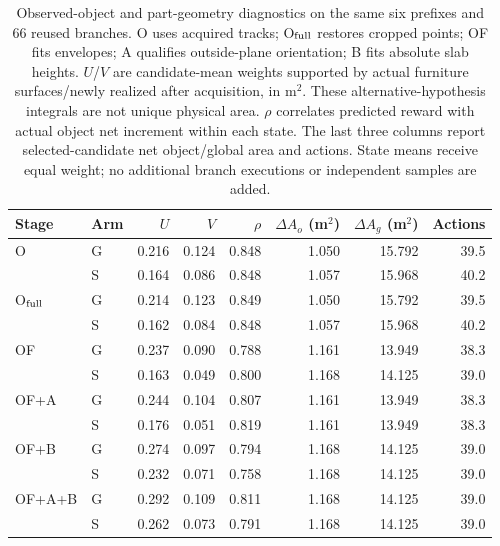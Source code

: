 \begin{table}[!htbp]
\centering\small\setlength{\tabcolsep}{4.0pt}
\caption{Observed-object and part-geometry diagnostics on the same six prefixes and 66 reused branches. O uses acquired tracks; O$_{\rm full}$ restores cropped points; OF fits envelopes; A qualifies outside-plane orientation; B fits absolute slab heights. $U$/$V$ are candidate-mean weights supported by actual furniture surfaces/newly realized after acquisition, in m$^2$. These alternative-hypothesis integrals are not unique physical area. $\rho$ correlates predicted reward with actual object net increment within each state. The last three columns report selected-candidate net object/global area and actions. State means receive equal weight; no additional branch executions or independent samples are added.}
\label{tab:observed-object-parts-diagnostic}
\begin{tabular}{llrrrrrr}
\toprule
Stage & Arm & $U$ & $V$ & $\rho$ & $\Delta A_o$ (m$^2$) & $\Delta A_g$ (m$^2$) & Actions \\
\midrule
O & G & 0.216 & 0.124 & 0.848 & 1.050 & 15.792 & 39.5 \\
 & S & 0.164 & 0.086 & 0.848 & 1.057 & 15.968 & 40.2 \\
O$_{\rm full}$ & G & 0.214 & 0.123 & 0.849 & 1.050 & 15.792 & 39.5 \\
 & S & 0.162 & 0.084 & 0.848 & 1.057 & 15.968 & 40.2 \\
OF & G & 0.237 & 0.090 & 0.788 & 1.161 & 13.949 & 38.3 \\
 & S & 0.163 & 0.049 & 0.800 & 1.168 & 14.125 & 39.0 \\
\midrule
OF+A & G & 0.244 & 0.104 & 0.807 & 1.161 & 13.949 & 38.3 \\
 & S & 0.176 & 0.051 & 0.819 & 1.161 & 13.949 & 38.3 \\
OF+B & G & 0.274 & 0.097 & 0.794 & 1.168 & 14.125 & 39.0 \\
 & S & 0.232 & 0.071 & 0.758 & 1.168 & 14.125 & 39.0 \\
OF+A+B & G & 0.292 & 0.109 & 0.811 & 1.168 & 14.125 & 39.0 \\
 & S & 0.262 & 0.073 & 0.791 & 1.168 & 14.125 & 39.0 \\
\bottomrule
\end{tabular}
\end{table}
